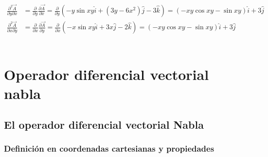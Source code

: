 \documentclass[12pt,openany]{book}
\begin{document}
				\begin{equation*}
					\begin{split}
						\frac{\partial^{2} \vec{A}}{\partial y\partial x}&=\frac{\partial}{\partial y}
									\frac{\partial \vec{A}}{\partial x}									
									=\frac{\partial}{\partial y}
									\left(-y\sin xy\hat{i}+(3y-6x^{2})\hat{j}-3\hat{k}\right)			
									=(-xy\cos xy-\sin xy)\hat{i}+3\hat{j}								\\
						\frac{\partial^{2} \vec{A}}{\partial x\partial y}&=\frac{\partial}{\partial x}
									\frac{\partial \vec{A}}{\partial y}									
									=\frac{\partial}{\partial x}
									\left(-x\sin xy\hat{i}+3x\hat{j}-2\hat{k}\right)					
									=(-xy\cos xy -\sin xy)\hat{i}+3\hat{j}	
					\end{split}
				\end{equation*}

				\begin{equation*}
					\begin{split}
					\end{split}
				\end{equation*}



	
\chapter{Operador diferencial vectorial nabla}

	\section{El operador diferencial vectorial Nabla}

	   \subsection{Definici\'on en coordenadas cartesianas y propiedades}

\end{document}
